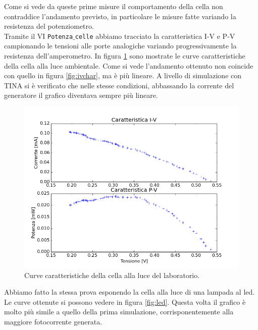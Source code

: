 \documentclass[journal, a4paper]{IEEEtran}
\begin{document}
Come si vede da queste prime misure il comportamento della cella non contraddice l'andamento previsto, in particolare le misure fatte variando la resistenza del potenziometro.\\

Tramite il VI \texttt{Potenza$\_$celle} abbiamo tracciato la caratteristica I-V e P-V campionando le tensioni alle porte analogiche variando progressivamente la resistenza dell'amperometro. In figura \ref{fig:lab} sono mostrate le curve caratteristiche della cella alla luce ambientale. Come si vede  l'andamento ottenuto non coincide con quello in figura \ref{fig:ivchar}, ma è più lineare. A livello di simulazione con TINA si è verificato che nelle stesse condizioni, abbassando la corrente del generatore il grafico diventava sempre più lineare.

\begin{figure}[htp]
\centering
\includegraphics[scale=.45]{es4_luceamb}
\caption{Curve caratteristiche della cella alla luce del laboratorio.}
\label{fig:lab}
\end{figure}

Abbiamo fatto la stessa prova esponendo la cella alla luce di una lampada al led. Le curve ottenute si possono vedere in figura \ref{fig:led}. Questa volta il grafico è molto più simile a quello della prima simulazione, corrisponentemente alla maggiore fotocorrente generata.
\end{document}
